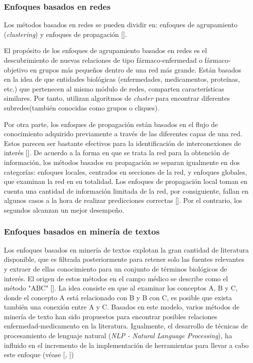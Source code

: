 \subsubsection{Enfoques basados en redes}
Los métodos basados en redes se pueden dividir en: enfoques de agrupamiento (\textit{clustering}) y enfoques de propagación [\cite{xue}].

El propósito de los enfoques de agrupamiento basados en redes es el descubrimiento de nuevas relaciones de tipo fármaco-enfermedad o fármaco-objetivo en grupos más pequeños dentro de una red más grande. Están basados en la idea de que entidades biológicas (enfermedades, medicamentos, proteínas, etc.) que pertenecen al mismo módulo de redes, comparten características similares. Por tanto, utilizan algoritmos de \textit{cluster} para encontrar diferentes subredes(también conocidas como grupos o cliques).

Por otra parte, los enfoques de propagación están basados en el flujo de conocimiento adquirido previamente a través de las diferentes capas de una red. Estos parecen ser bastante efectivos para la identificación de interconexiones de interés [\cite{emig}]. De acuerdo a la forma en que se trata la red para la obtención de información, los métodos basados en propagación se separan igualmente en dos categorías: enfoques locales, centrados en secciones de la red, y enfoques globales, que examinan la red en su totalidad. Los enfoques de propagación local toman en cuenta una cantidad de información limitada de la red, por consiguiente, fallan en algunos casos a la hora de realizar predicciones correctas [\cite{emig}]. Por el contrario, los segundos alcanzan un mejor desempeño.

\subsubsection{Enfoques basados en minería de textos}
Los enfoques basados en minería de textos explotan la gran cantidad de literatura disponible, que es filtrada posteriormente para retener solo las fuentes relevantes y extraer de ellas conocimiento para un conjunto de términos biológicos de interés. El origen de estos métodos en el campo médico se describe como el método "ABC" [\cite{weeber}]. La idea consiste en que al examinar los conceptos A, B y C, donde el concepto A está relacionado con B y B con C, es posible que exista también una conexión entre A y C. Basados en este modelo, varios métodos de minería de texto han sido propuestos para encontrar posibles relaciones enfermedad-medicamento en la literatura. Igualmente, el desarrollo de técnicas de procesamiento de lenguaje natural (\textit{NLP - Natural Language Processing}), ha influido en el incremento de la implementación de herramientas para llevar a cabo este enfoque (véase [\cite{miningapps1}, \cite{miningapps2}])


